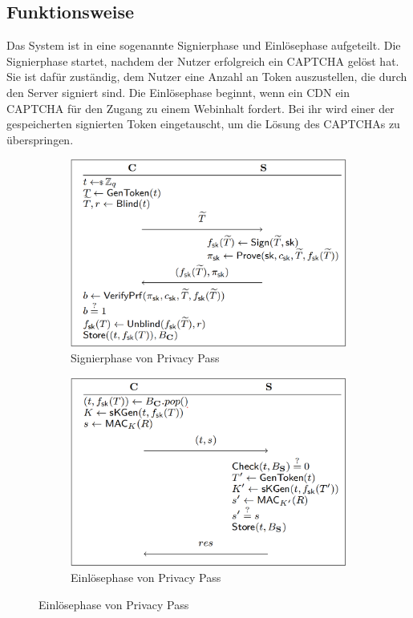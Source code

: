 \documentclass[
	fontsize=11pt,
	headings=small,
	parskip=half,           %
	bibliography=totoc,
	numbers=noenddot,       %
	open=any,               %
]{scrreprt}
\begin{document}
\subsection{Funktionsweise}
Das System ist in eine sogenannte Signierphase und Einlösephase aufgeteilt. Die Signierphase startet, nachdem der Nutzer erfolgreich ein CAPTCHA gelöst hat. Sie ist dafür zuständig, dem Nutzer eine Anzahl an Token auszustellen, die durch den Server signiert sind. Die Einlösephase beginnt, wenn ein CDN ein CAPTCHA für den Zugang zu einem Webinhalt fordert. Bei ihr wird einer der gespeicherten signierten Token eingetauscht, um die Lösung des CAPTCHAs zu überspringen. 

\begin{figure}[h]
    \centering
    \begin{subfigure}[b]{0.45\textwidth}
        \includegraphics[width=\textwidth]{pp_signphase.png}
        \caption{Signierphase von Privacy Pass \cite{pp-davidson2018privacy}}
        \label{fig:pp-signingphase}
    \end{subfigure}
    \hfill
    \begin{subfigure}[b]{0.45\textwidth}
        \includegraphics[width=\textwidth]{pp-redemptionphase.png} 
        \caption{Einlösephase von Privacy Pass \cite{pp-davidson2018privacy}}
        \label{fig:pp-redemptoinphase}    
    \end{subfigure}
\end{figure}
\end{document}
